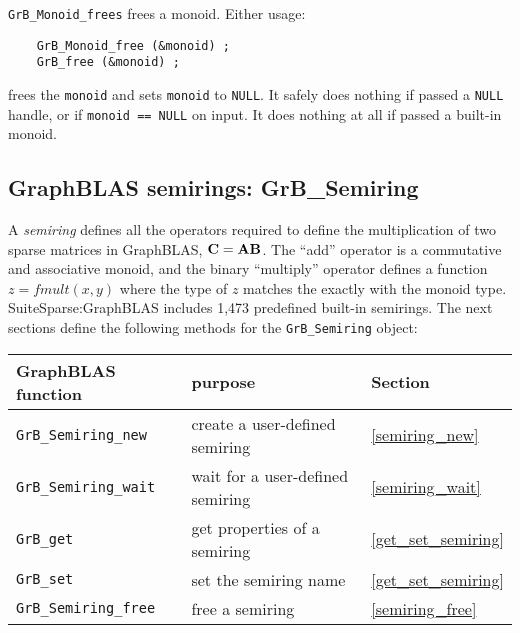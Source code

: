 \documentclass[12pt]{article}
\begin{document}
\verb'GrB_Monoid_frees' frees a monoid.  Either usage:

    {\small
    \begin{verbatim}
    GrB_Monoid_free (&monoid) ;
    GrB_free (&monoid) ; \end{verbatim}}

\noindent
frees the \verb'monoid' and sets \verb'monoid' to \verb'NULL'.  It safely does
nothing if passed a \verb'NULL' handle, or if \verb'monoid == NULL' on input.
It does nothing at all if passed a built-in monoid.

\newpage
\subsection{GraphBLAS semirings: {\sf GrB\_Semiring}} %
\label{semiring}

A {\em semiring} defines all the operators required to define the
multiplication of two sparse matrices in GraphBLAS, ${\bf C=AB}$.  The ``add''
operator is a commutative and associative monoid, and the binary ``multiply''
operator defines a function $z=fmult(x,y)$ where the type of $z$ matches the
exactly with the monoid type.  SuiteSparse:GraphBLAS includes 1,473 predefined
built-in semirings.  The next sections define the following methods for the
\verb'GrB_Semiring' object:

\vspace{0.2in}
{\footnotesize
\begin{tabular}{lll}
\hline
GraphBLAS function   & purpose                                      & Section \\
\hline
\verb'GrB_Semiring_new'       & create a user-defined semiring           & \ref{semiring_new} \\
\verb'GrB_Semiring_wait'      & wait for a user-defined semiring         & \ref{semiring_wait} \\
\verb'GrB_get'  & get properties of a semiring       & \ref{get_set_semiring} \\
\verb'GrB_set'  & set the semiring name              & \ref{get_set_semiring} \\
\verb'GrB_Semiring_free'      & free a semiring                          & \ref{semiring_free} \\
\hline
\end{tabular}
}
\end{document}

